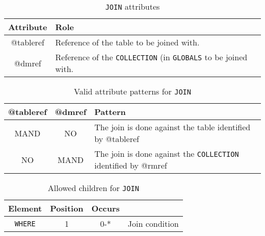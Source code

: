 \begin{lstlisting}[frame=single,caption={\texttt{JOIN} },style=XML,basicstyle=\tiny]

\end{lstlisting}


\begin{table}[!htbp]
\small
\centering
\begin{tabulary}{\linewidth}{|c|J|}       
       \hline 
            \textbf{Attribute} & 
            \textbf {Role}\\
       \hline         \hline  
             @tableref& 
            Reference of the table to be joined with. \\
        \hline 
            @dmref & 
            Reference of the \texttt{COLLECTION} (in \texttt{GLOBALS} to be joined with. \\
        \hline 
     \end{tabulary}
     \caption{\texttt{JOIN} attributes} 
     \label{tbl:join-att}
 \end{table}

\begin{table}[!htbp]
\small
\centering
\begin{tabulary}{\linewidth}{|c|c|J|}
    \hline 
        \textbf{@tableref} &
        \textbf{@dmref} &
        \textbf{Pattern}\\
    \hline      \hline  
        MAND &           
        NO &           
        The join is done against the table identified by @tableref \\
    \hline   
        NO &           
        MAND &           
        The join is done against the \texttt{COLLECTION} identified by @rmref \\
   \hline 
\end{tabulary}
     \caption{Valid attribute patterns for  \texttt{JOIN}}
     \label{tbl:join-pattern}
\end{table}


\begin{table}[!htbp]
\small
\centering
\begin{tabulary}{\linewidth}{|c |c |c|J|}
    \hline 
        \textbf{Element} &
        \textbf{Position} &
        \textbf{Occurs} &
        \\
    \hline      \hline  
        \texttt{WHERE}  &        
        1 &           
        0-* &
         Join condition\\
    \hline 
\end{tabulary}
     \caption{Allowed children for \texttt{JOIN}} 
     \label{tbl:join-chilren}
 \end{table}